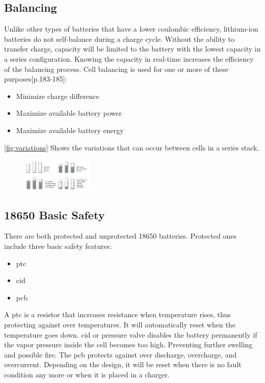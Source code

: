 \subsection{Balancing}
Unlike other types of batteries that have a lower coulombic efficiency, lithium-ion batteries do not self-balance during a charge cycle. Without the ability to transfer charge, capacity will be limited to the battery with the lowest capacity in a series configuration. Knowing the capacity in real-time increases the efficiency of the balancing process.
Cell balancing is used for one or more of these purposes\cite{book}[p.183-185]:

\begin{itemize}[noitemsep]
	\item Minimize charge difference
	\item Maximize available battery power
	\item Maximize available battery energy
\end{itemize}

\autoref{fig:variations} Shows the variations that can occur between cells in a series stack.

\begin{figure}[H]
	\centering
	\includegraphics[width=0.3\textwidth]{Figures/variations.png} 
	\label{fig:variations}
\end{figure}

\subsection{18650 Basic Safety}
There are both protected and unprotected 18650 batteries. Protected ones include three basic safety features\cite{webpage}:

\begin{itemize}[noitemsep]
	\item \gls{ptc}
	\item \gls{cid}
	\item \gls{pcb}
\end{itemize}

A \gls{ptc} is a resistor that increases resistance when temperature rises, thus protecting against over temperatures. It will automatically reset when the temperature goes down.
\gls{cid} or pressure valve disables the battery permanently if the vapor pressure inside the cell becomes too high. Preventing further swelling and possible fire.
The \gls{pcb} protects against over discharge, overcharge, and overcurrent. Depending on the design, it will be reset when there is no fault condition any more or when it is placed in a charger.  

